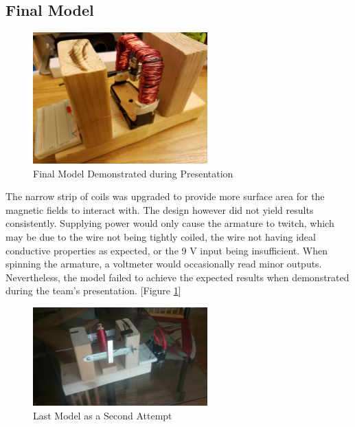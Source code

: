     \clearpage
    \subsection{Final Model}

    \begin{figure}[!ht]
        \begin{center}
            \includegraphics[width=0.6\textwidth]{figures/models/5.jpg}
        \end{center} \caption{Final Model Demonstrated during Presentation} \label{fig:model5}
    \end{figure}

    \noindent
    The narrow strip of coils was upgraded to provide more surface area for the magnetic fields to interact with. The design however did not yield results consistently. Supplying power would only cause the armature to twitch, which may be due to the wire not being tightly coiled, the wire not having ideal conductive properties as expected, or the 9 V input being insufficient. When spinning the armature, a voltmeter would occasionally read minor outputs. Nevertheless, the model failed to achieve the expected results when demonstrated during the team's presentation. [Figure \ref{fig:model5}]\\


    \begin{figure}[!ht]
        \begin{center}
            \includegraphics[width=0.6\textwidth]{figures/models/6.jpg}
        \end{center} \caption{Last Model as a Second Attempt} \label{fig:model6}
    \end{figure}

